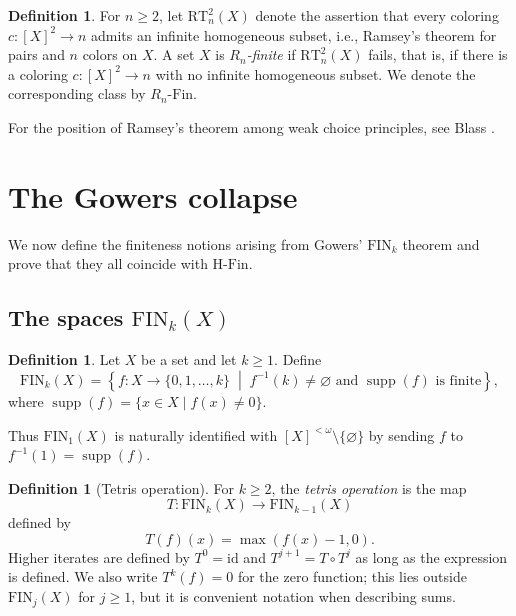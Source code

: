 \documentclass[10pt,a4paper]{amsart}
\theoremstyle{definition}
\newtheorem{definition}[theorem]{Definition}
\DeclareMathOperator{\supp}{supp}
\newcommand{\HFin}{\mathrm{H\text{-}Fin}}
\newcommand{\RnFin}[1]{R_{#1}\text{-}\mathrm{Fin}}
\newcommand{\FIN}{\mathrm{FIN}}
\newcommand{\RT}{\mathrm{RT}}
\begin{document}
\begin{definition}
For \(n\geq 2\), let \(\RT^2_n(X)\) denote the assertion that every coloring \(c:[X]^2\to n\) admits an infinite homogeneous subset, i.e., Ramsey's theorem for pairs and \(n\) colors on \(X\).  A set \(X\) is \emph{\(R_n\)-finite} if \(\RT^2_n(X)\) fails, that is, if there is a coloring \(c:[X]^2\to n\) with no infinite homogeneous subset.  We denote the corresponding class by \(\RnFin{n}\).
\end{definition}

For the position of Ramsey's theorem among weak choice principles, see Blass \cite{Blass77}.

\section{The Gowers collapse}

We now define the finiteness notions arising from Gowers' \(\FIN_k\) theorem and prove that they all coincide with \(\HFin\).

\subsection{The spaces \(\FIN_k(X)\)}

\begin{definition}
Let \(X\) be a set and let \(k\geq 1\).  Define
\[
    \FIN_k(X)=
    \left\{
        f:X\to\{0,1,\dots,k\}
        \;\middle|\;
        f^{-1}(k)\neq\varnothing\text{ and }\supp(f)\text{ is finite}
    \right\},
\]
where \(\supp(f)=\{x\in X\mid f(x)\neq 0\}\).
\end{definition}

Thus \(\FIN_1(X)\) is naturally identified with \([X]^{<\omega}\setminus\{\varnothing\}\) by sending \(f\) to \(f^{-1}(1)=\supp(f)\).

\begin{definition}[Tetris operation]
For \(k\geq 2\), the \emph{tetris operation} is the map
\[
    T:\FIN_k(X)\to \FIN_{k-1}(X)
\]
defined by
\[
    T(f)(x)=\max(f(x)-1,0).
\]
Higher iterates are defined by \(T^0=\mathrm{id}\) and \(T^{j+1}=T\circ T^j\) as long as the expression is defined.  We also write \(T^k(f)=0\) for the zero function; this lies outside \(\FIN_j(X)\) for \(j\geq 1\), but it is convenient notation when describing sums.
\end{definition}
\end{document}
